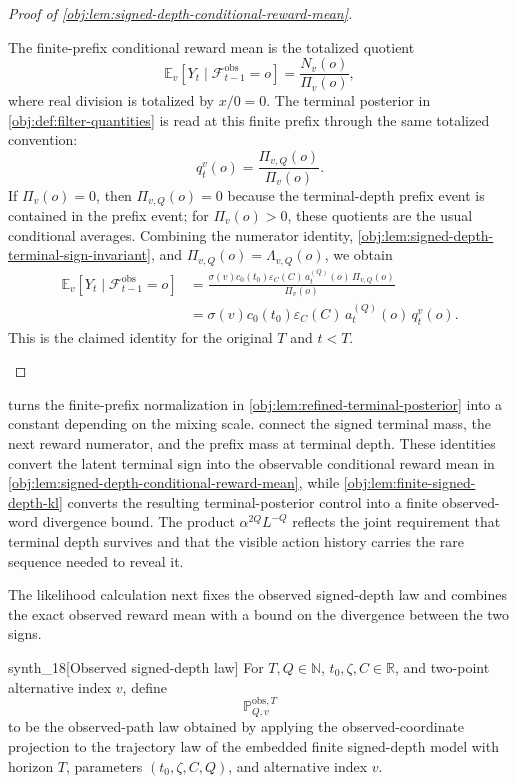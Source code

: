 \documentclass[11pt]{article}
\begin{document}
\begin{proof}[Proof of \cref{obj:lem:signed-depth-conditional-reward-mean}]
\begin{enumerate}
The finite-prefix conditional reward mean is the totalized quotient
\[
\mathbb E_v[Y_t\mid \mathcal F_{t-1}^{\mathrm{obs}}=o]
=
\frac{N_v(o)}{\Pi_v(o)},
\]
where real division is totalized by \(x/0=0\). The terminal posterior in \cref{obj:def:filter-quantities} is read at this finite prefix through the same totalized convention:
\[
q_t^v(o)=\frac{\Pi_{v,Q}(o)}{\Pi_v(o)}.
\]
If \(\Pi_v(o)=0\), then \(\Pi_{v,Q}(o)=0\) because the terminal-depth prefix event is contained in the prefix event; for \(\Pi_v(o)>0\), these quotients are the usual conditional averages. Combining the numerator identity, \cref{obj:lem:signed-depth-terminal-sign-invariant}, and \(\Pi_{v,Q}(o)=\Lambda_{v,Q}(o)\), we obtain
\[
\begin{aligned}
\mathbb E_v[Y_t\mid \mathcal F_{t-1}^{\mathrm{obs}}=o]
&=
\frac{\sigma(v)c_0(t_0)\varepsilon_C(C)\,
a_t^{(Q)}(o)\,\Pi_{v,Q}(o)}{\Pi_v(o)} \\
&=
\sigma(v)c_0(t_0)\varepsilon_C(C)\,
a_t^{(Q)}(o)\,q_t^v(o).
\end{aligned}
\]
This is the claimed identity for the original \(T\) and \(t<T\). %
\end{enumerate}
\end{proof}

 turns the finite-prefix normalization in \cref{obj:lem:refined-terminal-posterior} into a constant depending on the mixing scale.  connect the signed terminal mass, the next reward numerator, and the prefix mass at terminal depth. These identities convert the latent terminal sign into the observable conditional reward mean in \cref{obj:lem:signed-depth-conditional-reward-mean}, while \cref{obj:lem:finite-signed-depth-kl} converts the resulting terminal-posterior control into a finite observed-word divergence bound. The product \(\alpha^{2Q}L^{-Q}\) reflects the joint requirement that terminal depth survives and that the visible action history carries the rare sequence needed to reveal it.

The likelihood calculation next fixes the observed signed-depth law and combines the exact observed reward mean with a bound on the divergence between the two signs.

\begin{definitionv}{synth_18}[Observed signed-depth law]
For \(T,Q\in\mathbb N\), \(t_0,\zeta,C\in\mathbb R\), and two-point alternative index \(v\), define
\[
\mathbb P_{Q,v}^{\mathrm{obs},T}
\]
to be the observed-path law obtained by applying the observed-coordinate projection to the trajectory law of the embedded finite signed-depth model with horizon \(T\), parameters \((t_0,\zeta,C,Q)\), and alternative index \(v\).
\end{definitionv}
\end{document}
